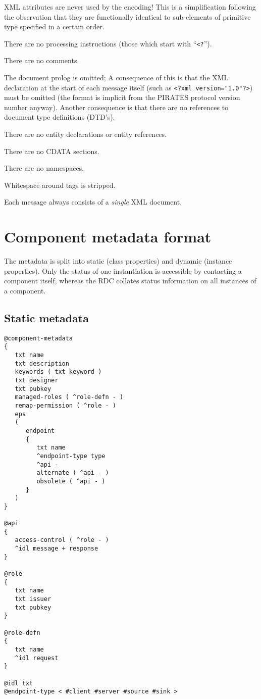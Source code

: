 \documentclass[12pt,a4paper,twoside]{article}
\renewcommand{\_}{\texttt{\symbol{95}}}
\begin{document}
\begin{bulletlist}
\item XML attributes are never used by the encoding! This is
	a simplification following the observation that they are
	functionally identical to sub-elements of primitive type
	specified in a certain order.
\item There are no processing instructions (those which start with
   ``\verb^<?^'').
\item There are no comments.
\item The document prolog is omitted;
	A consequence of this is that the XML declaration at the
	start of each message itself (such as \verb^<?xml version="1.0"?>^)
	must be omitted (the format is implicit from the PIRATES protocol
	version number anyway).
	Another consequence is that there are no references to
	document type definitions (DTD's).
\item There are no entity declarations or entity references.
\item There are no CDATA sections.
\item There are no namespaces.
\end{bulletlist}

Whitespace around tags is stripped.

Each message always consists of a \textit{single} XML document.

\newpage
\section{Component metadata format}

The metadata is split into static (class properties) and dynamic
(instance properties). Only the status of one instantiation is
accessible by contacting a component itself, whereas the RDC
collates status information on all instances of a component.


\subsection{Static metadata}
\label{metadata}

\begin{verbatim}
@component-metadata
{
   txt name
   txt description
   keywords ( txt keyword )
   txt designer
   txt pubkey
   managed-roles ( ^role-defn - )
   remap-permission ( ^role - )
   eps
   (
      endpoint
      {
         txt name
         ^endpoint-type type
         ^api -
         alternate ( ^api - )
         obsolete ( ^api - )
      }
   )
}

@api
{
   access-control ( ^role - )
   ^idl message + response
}

@role
{
   txt name
   txt issuer
   txt pubkey
}

@role-defn
{
   txt name
   ^idl request
}

@idl txt
@endpoint-type < #client #server #source #sink >
\end{verbatim}
\end{document}
